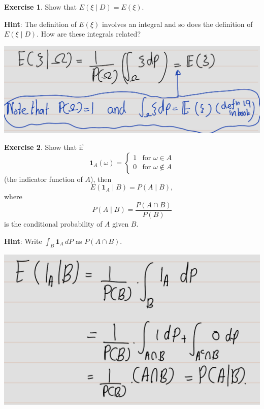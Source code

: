 \documentclass[
]{book}
\theoremstyle{definition}
\theoremstyle{definition}
\theoremstyle{definition}
\newtheorem{exercise}{Exercise}[chapter]
\theoremstyle{definition}
\theoremstyle{remark}
\begin{document}
\begin{exercise}
\protect\hypertarget{exr:unnamed-chunk-43}{}\label{exr:unnamed-chunk-43}Show that \(E(\xi \mid D) = E(\xi)\).

\textbf{Hint}: The definition of \(E(\xi)\) involves an integral and so does the definition of \(E(\xi \mid D)\). How are these integrals related?
\end{exercise}

\includegraphics[width=18cm,height=\textheight]{fig/fig ex2.1.png}

\begin{exercise}
\protect\hypertarget{exr:unnamed-chunk-44}{}\label{exr:unnamed-chunk-44}Show that if
\[
\mathbf{1}_A(\omega) = 
\begin{cases} 
1 & \text{for } \omega \in A \\ 
0 & \text{for } \omega \notin A 
\end{cases}
\]
(the indicator function of \(A\)), then
\[
E(\mathbf{1}_A \mid B) = P(A \mid B),
\]
where
\[
P(A \mid B) = \frac{P(A \cap B)}{P(B)}
\]
is the conditional probability of \(A\) given \(B\).

\textbf{Hint}: Write \(\int_B \mathbf{1}_A \, dP\) as \(P(A \cap B)\).
\end{exercise}

\includegraphics[width=18cm,height=\textheight]{fig/fig ex2.2.png}
\end{document}
